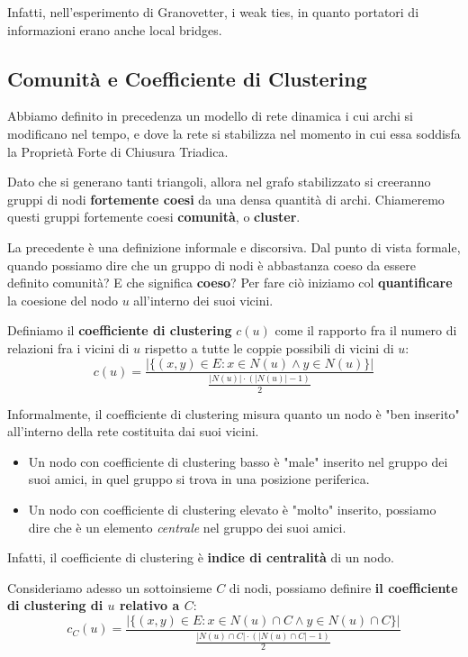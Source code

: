 Infatti, nell'esperimento di Granovetter, i weak ties, in quanto portatori di informazioni erano anche local bridges.

\subsection{Comunità e Coefficiente di Clustering}

Abbiamo definito in precedenza un modello di rete dinamica i cui archi si modificano nel tempo, e dove la rete si stabilizza nel momento in cui essa soddisfa la Proprietà Forte di Chiusura Triadica.

Dato che si generano tanti triangoli, allora nel grafo stabilizzato si creeranno gruppi di nodi \textbf{fortemente coesi} da una densa quantità di archi.
Chiameremo questi gruppi fortemente coesi \textbf{comunità}, o \textbf{cluster}.

La precedente è una definizione informale e discorsiva.
Dal punto di vista formale, quando possiamo dire che un gruppo di nodi è abbastanza coeso da essere definito comunità?
E che significa \textbf{coeso}?
Per fare ciò iniziamo col \textbf{quantificare} la coesione del nodo $u$ all'interno dei suoi vicini.

\begin{definizione}
    Definiamo il \textbf{coefficiente di clustering} $c(u)$ come il rapporto fra il numero di relazioni fra i vicini di $u$ rispetto a tutte le coppie possibili di vicini di $u$:
    \[
    c(u) = \frac{|\{(x,y) \in E: x \in N(u) \land y \in N(u)\}|}{\frac{|N(u)| \cdot (|N(u)| - 1)}{2}}
    \]
\end{definizione}

Informalmente, il coefficiente di clustering misura quanto un nodo è "ben inserito" all'interno della rete costituita dai suoi vicini.
\begin{itemize}
    \item Un nodo con coefficiente di clustering basso è "male" inserito nel gruppo dei suoi amici, in quel gruppo si trova in una posizione periferica.
    \item Un nodo con coefficiente di clustering elevato è "molto" inserito, possiamo dire che è un elemento \textit{centrale} nel gruppo dei suoi amici.
\end{itemize}

Infatti, il coefficiente di clustering è \textbf{indice di centralità} di un nodo.

\begin{definizione}
Consideriamo adesso un sottoinsieme $C$ di nodi, possiamo definire \textbf{il coefficiente di clustering di $u$ relativo a $C$}:
\[
c_C(u) = \frac{|\{(x,y) \in E: x \in N(u) \cap C \land y \in N(u) \cap C\}|}{\frac{|N(u) \cap C| \cdot (|N(u) \cap C| - 1)}{2}}
\]
\end{definizione}

